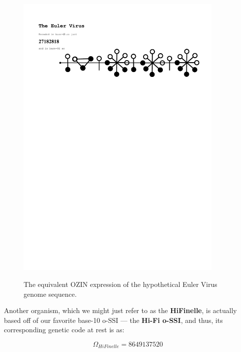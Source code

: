 \documentclass[a4paper, 18pt]{book} %
\begin{document}
\begin{figure}[H]
  \begin{center}
   \includegraphics[trim=0cm 20cm 0cm 0cm, clip, width=0.9\textwidth,]{resources/pdfs/OZINCIPHER-APP1-EVIRUS.pdf}\\
   \caption{The equivalent OZIN expression of the hypothetical Euler Virus genome sequence.}
  \label{FIGOZEVIRUS}
  \end{center}
\end{figure}


Another organism, which we might just refer to as the \textbf{HiFinelle}, is actually based off of our favorite base-10 o-SSI --- the \textbf{Hi-Fi o-SSI}\cite{adtpaper}, and thus, its corresponding genetic code at rest is as:


\begin{equation}
\label{EQDNHIFI}
\Omega_{HiFinelle} = 8649137520
\end{equation}
\end{document}
